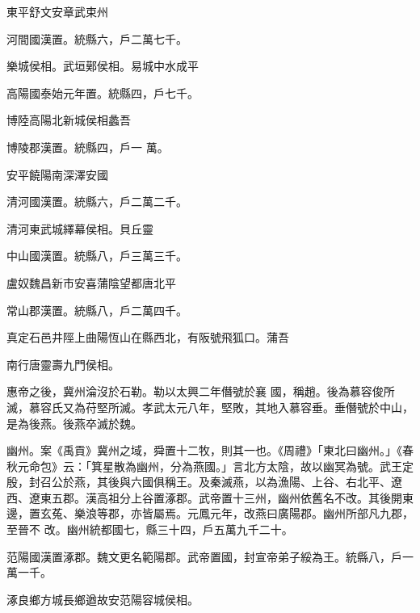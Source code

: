 \begin{pinyinscope}
 東平舒文安章武束州



 河間國漢置。統縣六，戶二萬七千。



 樂城侯相。武垣鄚侯相。易城中水成平



 高陽國泰始元年置。統縣四，戶七千。



 博陸高陽北新城侯相蠡吾



 博陵郡漢置。統縣四，戶一
 萬。



 安平饒陽南深澤安國



 清河國漢置。統縣六，戶二萬二千。



 清河東武城繹幕侯相。貝丘靈



 中山國漢置。統縣八，戶三萬三千。



 盧奴魏昌新市安喜蒲陰望都唐北平



 常山郡漢置。統縣八，戶二萬四千。



 真定石邑井陘上曲陽恆山在縣西北，有阪號飛狐口。蒲吾



 南行唐靈壽九門侯相。



 惠帝之後，冀州淪沒於石勒。勒以太興二年僭號於襄
 國，稱趙。後為慕容俊所滅，慕容氏又為苻堅所滅。孝武太元八年，堅敗，其地入慕容垂。垂僭號於中山，是為後燕。後燕卒滅於魏。



 幽州。案《禹貢》冀州之域，舜置十二牧，則其一也。《周禮》「東北曰幽州。」《春秋元命包》云：「箕星散為幽州，分為燕國。」言北方太陰，故以幽冥為號。武王定殷，封召公於燕，其後與六國俱稱王。及秦滅燕，以為漁陽、上谷、右北平、遼西、遼東五郡。漢高祖分上谷置涿郡。武帝置十三州，幽州依舊名不改。其後開東邊，置玄菟、樂浪等郡，亦皆屬焉。元鳳元年，改燕曰廣陽郡。幽州所部凡九郡，至晉不
 改。幽州統都國七，縣三十四，戶五萬九千二十。



 范陽國漢置涿郡。魏文更名範陽郡。武帝置國，封宣帝弟子綏為王。統縣八，戶一萬一千。



 涿良鄉方城長鄉遒故安范陽容城侯相。




\end{pinyinscope}
